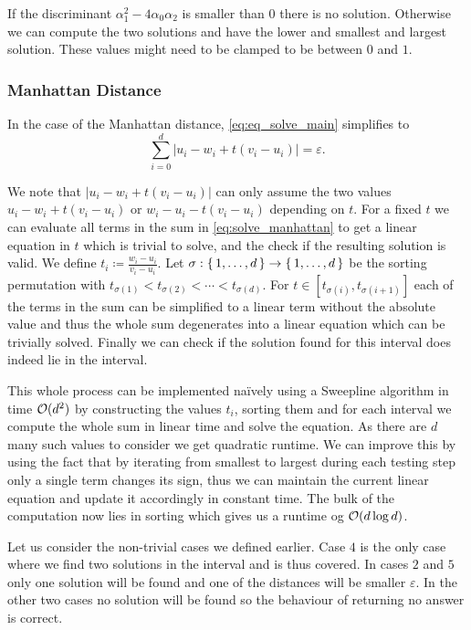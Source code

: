 If the discriminant \(\alpha_1^2 - 4\alpha_0\alpha_2\) is smaller than \(0\) there is no solution. Otherwise we can compute the two solutions and have the lower and smallest and largest solution. These values might need to be clamped to be between \(0\) and \(1\). 


\subsubsection{Manhattan Distance}
\label{subsubsec:eq_manhattan_distance}
In the case of the Manhattan distance, \cref{eq:eq_solve_main} simplifies to 
\begin{equation}
  \sum_{i=0}^d |u_i - w_i + t (v_i - u_i)| = \varepsilon. \label{eq:solve_manhattan}
\end{equation}

We note that \(|u_i - w_i + t (v_i - u_i )|\) can only assume the two values \(u_i - w_i + t(v_i - u_i)\) or \(w_i - u_i - t(v_i - u_i)\) depending on \(t\). For a fixed \(t\) we can evaluate all terms in the sum in \cref{eq:solve_manhattan} to get a linear equation in \(t\) which is trivial to solve, and the check if the resulting solution is valid. We define \(t_i \coloneq \frac{w_i - u_i}{v_i - u_i} \). Let \(\sigma:\set{1,\dots, d} \to \set{1,\dots, d}\) be the sorting permutation with \(t_{\sigma(1)} < t_{\sigma(2)} < \cdots < t_{\sigma(d)}\). For \(t \in [t_{\sigma(i)}, t_{\sigma(i+1)}]\) each of the terms in the sum can be simplified to a linear term without the absolute value and thus the whole sum degenerates into a linear equation which can be trivially solved. Finally we can check if the solution found for this interval does indeed lie in the interval. 

This whole process can be implemented na\"ively using a Sweepline algorithm in time \(\mathcal{O}(d^2)\) by constructing the values \(t_i\), sorting them and for each interval we compute the whole sum in linear time and solve the equation. As there are \(d\) many such values to consider we get quadratic runtime. We can improve this by using the fact that by iterating from smallest to largest during each testing step only a single term changes its sign, thus we can maintain the current linear equation and update it accordingly in constant time. The bulk of the computation now lies in sorting which gives us a runtime og \(\mathcal{O}(d \log d)\). 

Let us consider the non-trivial cases we defined earlier. Case \(4\) is the only case where we find two solutions in the interval and is thus covered. In cases \(2\) and \(5\) only one solution will be found and one of the distances will be smaller \(\varepsilon\). In the other two cases no solution will be found so the behaviour of returning no answer is correct.

